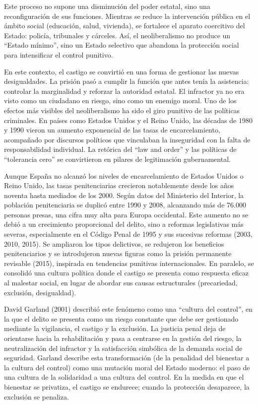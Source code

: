 \documentclass[
  spanish,
  letterpaper,
  DIV=11,
  numbers=noendperiod]{scrreprt}
\begin{document}
Este proceso no supone una disminución del poder estatal, sino una
reconfiguración de sus funciones. Mientras se reduce la intervención
pública en el ámbito social (educación, salud, vivienda), se fortalece
el aparato coercitivo del Estado: policía, tribunales y cárceles. Así,
el neoliberalismo no produce un ``Estado mínimo'', sino un Estado
selectivo que abandona la protección social para intensificar el control
punitivo.

En este contexto, el castigo se convirtió en una forma de gestionar las
nuevas desigualdades. La prisión pasó a cumplir la función que antes
tenía la asistencia: controlar la marginalidad y reforzar la autoridad
estatal. El infractor ya no era visto como un ciudadano en riesgo, sino
como un enemigo moral. Uno de los efectos más visibles del
neoliberalismo ha sido el giro punitivo de las políticas criminales. En
países como Estados Unidos y el Reino Unido, las décadas de 1980 y 1990
vieron un aumento exponencial de las tasas de encarcelamiento,
acompañado por discursos políticos que vinculaban la inseguridad con la
falta de responsabilidad individual. La retórica del ``law and order'' y
las políticas de ``tolerancia cero'' se convirtieron en pilares de
legitimación gubernamental.

Aunque España no alcanzó los niveles de encarcelamiento de Estados
Unidos o Reino Unido, las tasas penitenciarias crecieron notablemente
desde los años noventa hasta mediados de los 2000. Según datos del
Ministerio del Interior, la población penitenciaria se duplicó entre
1990 y 2008, alcanzando más de 76.000 personas presas, una cifra muy
alta para Europa occidental. Este aumento no se debió a un crecimiento
proporcional del delito, sino a reformas legislativas más severas,
especialmente en el Código Penal de 1995 y sus sucesivas reformas (2003,
2010, 2015). Se ampliaron los tipos delictivos, se redujeron los
beneficios penitenciarios y se introdujeron nuevas figuras como la
prisión permanente revisable (2015), inspirada en tendencias punitivas
internacionales. En paralelo, se consolidó una cultura política donde el
castigo se presenta como respuesta eficaz al malestar social, en lugar
de abordar sus causas estructurales (precariedad, exclusión,
desigualdad).

David Garland (2001) describió este fenómeno como una ``cultura del
control'', en la que el delito se presenta como un riesgo constante que
debe ser gestionado mediante la vigilancia, el castigo y la exclusión.
La justicia penal deja de orientarse hacia la rehabilitación y pasa a
centrarse en la gestión del riesgo, la neutralización del infractor y la
satisfacción simbólica de la demanda social de seguridad. Garland
describe esta transformación (de la penalidad del bienestar a la cultura
del control) como una mutación moral del Estado moderno: el paso de una
cultura de la solidaridad a una cultura del control. En la medida en que
el bienestar se privatiza, el castigo se endurece; cuando la protección
desaparece, la exclusión se penaliza.
\end{document}
